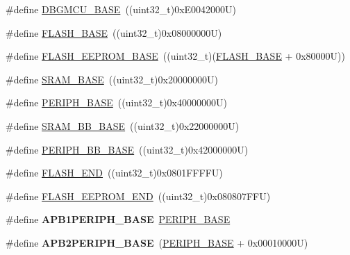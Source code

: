 \begin{DoxyCompactItemize}
\item 
\#define \hyperlink{group___peripheral__memory__map_ga4adaf4fd82ccc3a538f1f27a70cdbbef}{D\-B\-G\-M\-C\-U\-\_\-\-B\-A\-S\-E}~((uint32\-\_\-t)0x\-E0042000\-U)
\item 
\#define \hyperlink{group___peripheral__memory__map_ga23a9099a5f8fc9c6e253c0eecb2be8db}{F\-L\-A\-S\-H\-\_\-\-B\-A\-S\-E}~((uint32\-\_\-t)0x08000000\-U)
\item 
\#define \hyperlink{group___peripheral__memory__map_ga45b9071c81cb72a66e2e3195343fcb3a}{F\-L\-A\-S\-H\-\_\-\-E\-E\-P\-R\-O\-M\-\_\-\-B\-A\-S\-E}~((uint32\-\_\-t)(\hyperlink{group___peripheral__memory__map_ga23a9099a5f8fc9c6e253c0eecb2be8db}{F\-L\-A\-S\-H\-\_\-\-B\-A\-S\-E} + 0x80000\-U))
\item 
\#define \hyperlink{group___peripheral__memory__map_ga05e8f3d2e5868754a7cd88614955aecc}{S\-R\-A\-M\-\_\-\-B\-A\-S\-E}~((uint32\-\_\-t)0x20000000\-U)
\item 
\#define \hyperlink{group___peripheral__memory__map_ga9171f49478fa86d932f89e78e73b88b0}{P\-E\-R\-I\-P\-H\-\_\-\-B\-A\-S\-E}~((uint32\-\_\-t)0x40000000\-U)
\item 
\#define \hyperlink{group___peripheral__memory__map_gad3548b6e2f017f39d399358f3ac98454}{S\-R\-A\-M\-\_\-\-B\-B\-\_\-\-B\-A\-S\-E}~((uint32\-\_\-t)0x22000000\-U)
\item 
\#define \hyperlink{group___peripheral__memory__map_gaed7efc100877000845c236ccdc9e144a}{P\-E\-R\-I\-P\-H\-\_\-\-B\-B\-\_\-\-B\-A\-S\-E}~((uint32\-\_\-t)0x42000000\-U)
\item 
\#define \hyperlink{group___peripheral__memory__map_ga8be554f354e5aa65370f6db63d4f3ee4}{F\-L\-A\-S\-H\-\_\-\-E\-N\-D}~((uint32\-\_\-t)0x0801\-F\-F\-F\-F\-U)
\item 
\#define \hyperlink{group___peripheral__memory__map_gac8cb9b66893a7c4bdff3258909af027a}{F\-L\-A\-S\-H\-\_\-\-E\-E\-P\-R\-O\-M\-\_\-\-E\-N\-D}~((uint32\-\_\-t)0x080807\-F\-F\-U)
\item 
\hypertarget{group___peripheral__memory__map_ga45666d911f39addd4c8c0a0ac3388cfb}{\#define {\bfseries A\-P\-B1\-P\-E\-R\-I\-P\-H\-\_\-\-B\-A\-S\-E}~\hyperlink{group___peripheral__memory__map_ga9171f49478fa86d932f89e78e73b88b0}{P\-E\-R\-I\-P\-H\-\_\-\-B\-A\-S\-E}}\label{group___peripheral__memory__map_ga45666d911f39addd4c8c0a0ac3388cfb}

\item 
\hypertarget{group___peripheral__memory__map_ga25b99d6065f1c8f751e78f43ade652cb}{\#define {\bfseries A\-P\-B2\-P\-E\-R\-I\-P\-H\-\_\-\-B\-A\-S\-E}~(\hyperlink{group___peripheral__memory__map_ga9171f49478fa86d932f89e78e73b88b0}{P\-E\-R\-I\-P\-H\-\_\-\-B\-A\-S\-E} + 0x00010000\-U)}\label{group___peripheral__memory__map_ga25b99d6065f1c8f751e78f43ade652cb}


\end{DoxyCompactItemize}
